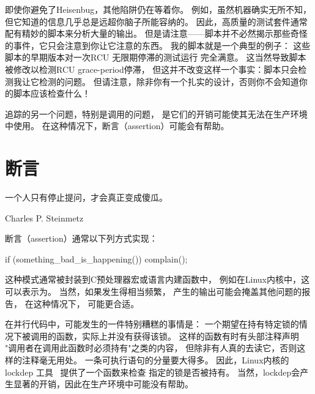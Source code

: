 即使你避免了Heisenbug，其他陷阱仍在等着你。
例如，虽然机器确实无所不知，
但它知道的信息几乎总是远超你脑子所能容纳的。
因此，高质量的测试套件通常配有精妙的脚本来分析大量的输出。
但是请注意——脚本并不必然揭示那些奇怪的事件，它只会注意到你让它注意的东西。
我的脚本就是一个典型的例子：
这些脚本的早期版本对一次RCU 无限期停滞的测试运行
完全满意。
这当然导致脚本被修改以检测RCU grace-period停滞，
但这并不改变这样一个事实：脚本只会检测我让它检测的问题。
但请注意，除非你有一个扎实的设计，否则你不会知道你的脚本应该检查什么！

追踪的另一个问题，特别是调用的问题，
是它们的开销可能使其无法在生产环境中使用。
在这种情况下，断言（assertion）可能会有帮助。

\section{断言}
\label{sec:debugging:Assertions}
%
\epigraph{一个人只有停止提问，才会真正变成傻瓜。}
	 {Charles P. Steinmetz}

断言（assertion）通常以下列方式实现：

\begin{VerbatimN}
if (something_bad_is_happening())
	complain();
\end{VerbatimN}

这种模式通常被封装到C预处理器宏或语言内建函数中，
例如在Linux内核中，这可以表示为。
当然，如果发生得相当频繁，
产生的输出可能会掩盖其他问题的报告，
在这种情况下，
可能更合适。

\QuickQuizEnd

在并行代码中，可能发生的一件特别糟糕的事情是：
一个期望在持有特定锁的情况下被调用的函数，实际上并没有获得该锁。
这样的函数有时有头部注释声明
"调用者在调用此函数时必须持有"之类的内容，
但除非有人真的去读它，否则这样的注释毫无用处。
一条可执行语句的分量要大得多。
因此，Linux内核的lockdep
工具~\cite{JonathanCorbet2006lockdep,StevenRostedt2011locdepCryptic}
提供了一个函数来检查
指定的锁是否被持有。
当然，lockdep会产生显著的开销，因此在生产环境中可能没有帮助。

